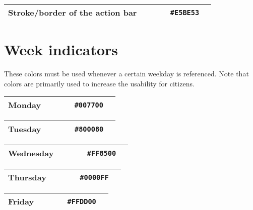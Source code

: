 \begin{table}[!htbp]
	\begin{tabularx}{\textwidth}{X r c r c}
		Stroke/border of the action bar 
		& ~ & ~
		& \texttt{\#E5BE53} & \cellcolor[HTML]{E5BE53}\phantom{--} \\ \hline
	\end{tabularx}
\end{table}


\section{Week indicators}
These colors must be used whenever a certain weekday is referenced. Note that colors are primarily used to increase the usability for citizens.


\begin{table}[!htbp]
	\begin{tabularx}{\textwidth}{X r c r c}
		Monday 
		& ~ & ~
		& \texttt{\#007700} & \cellcolor[HTML]{007700}\phantom{--} \\ \hline
	\end{tabularx}
\end{table}

\begin{table}[!htbp]
	\begin{tabularx}{\textwidth}{X r c r c}
		Tuesday 
		& ~ & ~
		& \texttt{\#800080} & \cellcolor[HTML]{800080}\phantom{--} \\ \hline
	\end{tabularx}
\end{table}

\begin{table}[!htbp]
	\begin{tabularx}{\textwidth}{X r c r c}
		Wednesday 
		& ~ & ~
		& \texttt{\#FF8500} & \cellcolor[HTML]{FF8500}\phantom{--} \\ \hline
	\end{tabularx}
\end{table}

\begin{table}[!htbp]
	\begin{tabularx}{\textwidth}{X r c r c}
		Thursday 
		& ~ & ~
		& \texttt{\#0000FF} & \cellcolor[HTML]{0000FF}\phantom{--} \\ \hline
	\end{tabularx}
\end{table}

\begin{table}[!htbp]
	\begin{tabularx}{\textwidth}{X r c r c}
		Friday 
		& ~ & ~
		& \texttt{\#FFDD00} & \cellcolor[HTML]{FFDD00}\phantom{--} \\ \hline
	\end{tabularx}
\end{table}

